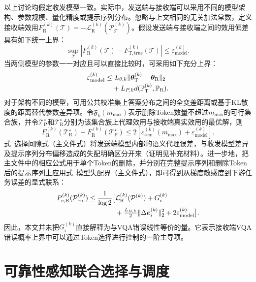 \documentclass[journal]{IEEEtran}
\begin{document}
以上讨论均假定收发模型一致。实际中，发送端与接收端可以采用不同的模型架构、参数规模、量化精度或提示序列分布。忽略与上文相同的无关加法常数，定义接收端效用$F_{\mathrm R}^{(k)}(\mathcal T)=-\mathcal L_{\mathrm R}^{(k)}(\mathcal P_{\mathcal T}^{(k)})$。假设发送端与接收端之间的效用偏差具有如下统一上界：
\begin{equation}
\sup_{\mathcal T}
|F_{\mathrm R}^{(k)}(\mathcal T)
-F_{\mathrm T,\mathrm{true}}^{(k)}(\mathcal T)|
\leq \varepsilon_{\mathrm{model}}^{(k)}.
\label{eq:model_mismatch}
\end{equation}
当两侧模型的参数一一对应且可以直接比较时，可采用如下充分上界：
\begin{align}
\varepsilon_{\mathrm{model}}^{(k)}
\leq&~L_{\theta,k}
\|\bm\theta_{\mathrm T}^{(k)}-\bm\theta_{\mathrm R}\|_2
\notag\\[-0.2em]
&+L_{P,k}d(\mathbb P_{\mathrm T}^{(k)},\mathbb P_{\mathrm R}).
\label{eq:model_mismatch_components}
\end{align}
对于架构不同的模型，可用公共校准集上答案分布之间的全变差距离或基于KL散度的距离替代参数差异项。令$\mathfrak F_k(m_{\max})$表示删除Token数量不超过$m_{\max}$的可行集合族，并令$\mathcal T_{\mathrm P}^{\star}$和$\mathcal T_{\mathrm R}^{\star}$分别为该集合族上代理效用与接收端真实效用的最优解，则
\begin{equation}
F_{\mathrm R}^{(k)}(\mathcal T_{\mathrm R}^{\star})
-F_{\mathrm R}^{(k)}(\mathcal T_{\mathrm P}^{\star})
\leq 2\left[
\varepsilon_{\mathrm{sem}}^{(k)}(m_{\max})
+\varepsilon_{\mathrm{model}}^{(k)}
\right].
\label{eq:proxy_selection_gap}
\end{equation}
式~选择间隙式（主文件式）将发送端模型内部的语义代理误差，与收发模型差异及提示序列分布偏移造成的失配明确区分开来（证明见补充材料）。进一步地，把主文件中的相应公式用于单个Token的删除，并分别在完整提示序列和删除Token后的提示序列上应用式~模型失配界（主文件式），即可得到从梯度敏感度到下游任务误差的显式联系：
\begin{align}
P_{e,\mathrm R}^{(k)}(\mathcal P_{-i}^{(k)})
\leq\frac{1}{\log 2}\big[&\mathcal L_{\mathrm R}^{(k)}(\mathcal P^{(k)})
+G_i^{(k)}
\notag\\[-0.2em]
&+\tfrac{L_{H,k}}{2}\|\Delta\bm e_i^{(k)}\|_2^2
+2\varepsilon_{\mathrm{model}}^{(k)}\big].
\label{eq:gradient_vqa_connection}
\end{align}
因此，本文并未把$G_i^{(k)}$直接解释为与VQA错误线性等价的量。它表示接收端VQA错误概率上界中可以通过Token选择进行控制的一阶主导项。

\section{可靠性感知联合选择与调度}
\label{sec:optimization}
\end{document}
